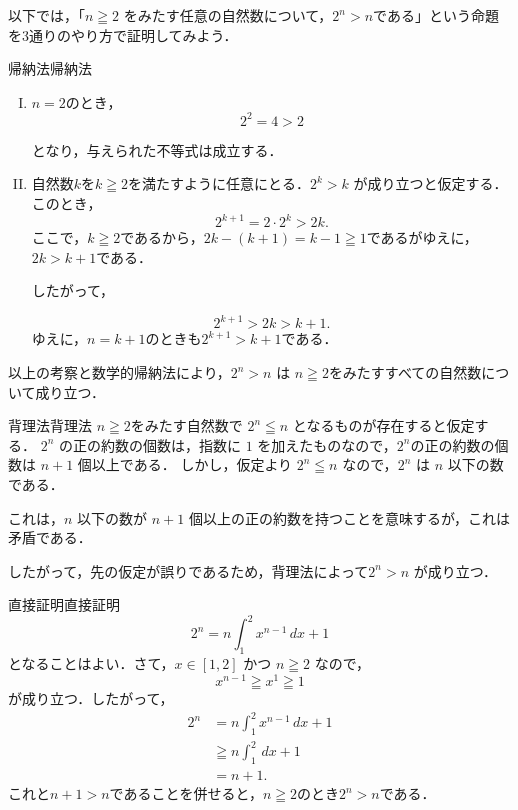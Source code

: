 \documentclass[a4paper,11pt]{ltjsarticle}
\renewcommand{\qed}{\unskip\nobreak\quad\qedsymbol}
\renewcommand{\geq}{\geqq}
\begin{document}
以下では，「$n \geq 2$ をみたす任意の自然数について，$2^n > n$である」という命題を3通りのやり方で証明してみよう．

\begin{example}{帰納法}{帰納法}
  \begin{enumerate}[(I)]
    \item $n=2$のとき，
          \[
            2^2 = 4 > 2
          \]

          となり，与えられた不等式は成立する．
    \item 自然数$k$を$k \geqq 2$を満たすように任意にとる．$2^k > k$ が成り立つと仮定する．このとき，
          \[
            2^{k+1} = 2 \cdot 2^k > 2k.
          \]
          ここで，$k \geqq 2$であるから，$2k - (k + 1) = k - 1 \geq 1$であるがゆえに，$2k > k + 1$である．

          したがって，

          \[
            2^{k+1} > 2k > k + 1.
          \]
          ゆえに，$n=k+1$のときも$2^{k+1} > k + 1$である．
  \end{enumerate}

  以上の考察と数学的帰納法により，$2^n > n$ は $n \geq 2$をみたすすべての自然数について成り立つ．\qed
\end{example}

\begin{example}{背理法}{背理法}
  $n \geqq 2$をみたす自然数で $2^n \leqq n$ となるものが存在すると仮定する．
  $2^n$ の正の約数の個数は，指数に $1$ を加えたものなので，$2^n$の正の約数の個数は $n + 1$ 個以上である．
  しかし，仮定より $2^n \leqq n$ なので，$2^n$ は $n$ 以下の数である．

  これは，$n$ 以下の数が $n + 1$ 個以上の正の約数を持つことを意味するが，これは矛盾である．

  したがって，先の仮定が誤りであるため，背理法によって$2^n > n$ が成り立つ．\qed
\end{example}

\begin{example}{直接証明}{直接証明}
  \[
    2^n = n \int_{1}^{2} x^{n-1} \, dx + 1
  \]
  となることはよい．さて，$x \in [1, 2]$ かつ $n \geqq 2$ なので，
  \[
    x^{n-1} \geqq x^{1} \geqq 1
  \]
  が成り立つ．したがって，
  \begin{align*}
    2^n & = n \int_{1}^{2} x^{n-1} \, dx + 1 \\
        & \geqq  n \int_{1}^{2} \, dx +1     \\
        & = n+1.
  \end{align*}
  これと$n+1 >n$であることを併せると，$n \geqq 2$のとき$2^n > n$である．\qed
\end{example}
\newpage
\end{document}
